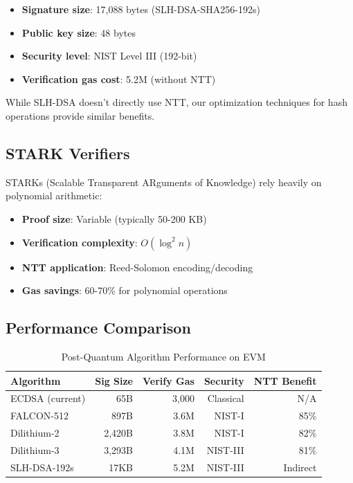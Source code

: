 \begin{itemize}
\item \textbf{Signature size}: 17,088 bytes (SLH-DSA-SHA256-192s)
\item \textbf{Public key size}: 48 bytes
\item \textbf{Security level}: NIST Level III (192-bit)
\item \textbf{Verification gas cost}: 5.2M (without NTT)
\end{itemize}

While SLH-DSA doesn't directly use NTT, our optimization techniques for hash operations provide similar benefits.

\subsection{STARK Verifiers}

STARKs (Scalable Transparent ARguments of Knowledge) rely heavily on polynomial arithmetic:

\begin{itemize}
\item \textbf{Proof size}: Variable (typically 50-200 KB)
\item \textbf{Verification complexity}: $O(\log^2 n)$
\item \textbf{NTT application}: Reed-Solomon encoding/decoding
\item \textbf{Gas savings}: 60-70\% for polynomial operations
\end{itemize}

\subsection{Performance Comparison}

\begin{table}[h]
\centering
\caption{Post-Quantum Algorithm Performance on EVM}
\begin{tabular}{lrrrr}
\toprule
Algorithm & Sig Size & Verify Gas & Security & NTT Benefit \\
\midrule
ECDSA (current) & 65B & 3,000 & Classical & N/A \\
FALCON-512 & 897B & 3.6M & NIST-I & 85\% \\
Dilithium-2 & 2,420B & 3.8M & NIST-I & 82\% \\
Dilithium-3 & 3,293B & 4.1M & NIST-III & 81\% \\
SLH-DSA-192s & 17KB & 5.2M & NIST-III & Indirect \\
\bottomrule
\end{tabular}
\end{table}

